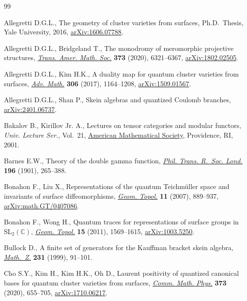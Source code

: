 \begin{thebibliography}{99}
\footnotesize\itemsep=0pt

Allegretti D.G.L., The geometry of cluster varieties from surfaces, Ph.D.~Thesis, {Y}ale University, 2016,
 \href{http://arxiv.org/abs/1606.07788}{arXiv:1606.07788}.

Allegretti D.G.L., Bridgeland T., The monodromy of meromorphic projective
 structures, \href{https://doi.org/10.1090/tran/8093}{\textit{Trans. Amer.
 Math. Soc.}} \textbf{373} (2020), 6321--6367,
 \href{http://arxiv.org/abs/1802.02505}{arXiv:1802.02505}.

Allegretti D.G.L., Kim H.K., A duality map for quantum cluster varieties from
 surfaces, \href{https://doi.org/10.1016/j.aim.2016.11.007}{\textit{Adv.
 Math.}} \textbf{306} (2017), 1164--1208,
 \href{http://arxiv.org/abs/1509.01567}{arXiv:1509.01567}.

Allegretti D.G.L., Shan P., Skein algebras and quantized Coulomb branches,
 \href{http://arxiv.org/abs/2401.06737}{arXiv:2401.06737}.

Bakalov B., Kirillov Jr. A., Lectures on tensor categories and modular
 functors, \textit{Univ. Lecture Ser.}, Vol.~21,
 \href{https://doi.org/10.1090/ulect/021}{American Mathematical Society},
 Providence, RI, 2001.

Barnes E.W., Theory of the double gamma function,
 \href{https://doi.org/10.1098/rsta.1901.0006}{\textit{Phil. Trans. R.~Soc.
 Lond.}} \textbf{196} (1901), 265--388.

Bonahon F., Liu X., Representations of the quantum {T}eichm\"{u}ller space and
 invariants of surface diffeomorphisms,
 \href{https://doi.org/10.2140/gt.2007.11.889}{\textit{Geom. Topol.}}
 \textbf{11} (2007), 889--937,
 \href{http://arxiv.org/abs/math.GT/0407086}{arXiv:math.GT/0407086}.

Bonahon F., Wong H., Quantum traces for representations of surface groups in
 {$\mathrm{ SL}_2(\mathbb{C})$},
 \href{https://doi.org/10.2140/gt.2011.15.1569}{\textit{Geom. Topol.}}
 \textbf{15} (2011), 1569--1615,
 \href{http://arxiv.org/abs/1003.5250}{arXiv:1003.5250}.

Bullock D., A finite set of generators for the {K}auffman bracket skein
 algebra, \href{https://doi.org/10.1007/PL00004727}{\textit{Math.~Z.}}
 \textbf{231} (1999), 91--101.

Cho S.Y., Kim H., Kim H.K., Oh D., Laurent positivity of quantized canonical
 bases for quantum cluster varieties from surfaces,
 \href{https://doi.org/10.1007/s00220-019-03411-w}{\textit{Comm. Math. Phys.}}
 \textbf{373} (2020), 655--705,
 \href{http://arxiv.org/abs/1710.06217}{arXiv:1710.06217}.


\end{thebibliography}
